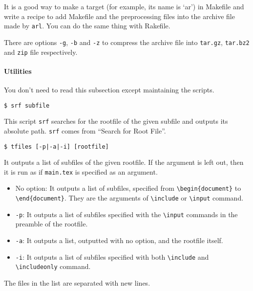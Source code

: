 It is a good way to make a target (for example, its name is `ar') in
Makefile and write a recipe to add Makefile and the preprocessing files
into the archive file made by \texttt{arl}. You can do the same thing
with Rakefile.

There are options \texttt{-g}, \texttt{-b} and \texttt{-z} to compress
the archive file into \texttt{tar.gz}, \texttt{tar.bz2} and \texttt{zip}
file respectively.

\hypertarget{utilities}{%
\paragraph{Utilities}\label{utilities}}

You don't need to read this subsection except maintaining the scripts.

\begin{verbatim}
$ srf subfile
\end{verbatim}

This script \texttt{srf} searches for the rootfile of the given subfile
and outputs its absolute path. \texttt{srf} comes from ``Search for Root
File''.

\begin{verbatim}
$ tfiles [-p|-a|-i] [rootfile]
\end{verbatim}

It outputs a list of subfiles of the given rootfile. If the argument is
left out, then it is run as if \texttt{main.tex} is specified as an
argument.

\begin{itemize}
\tightlist
\item
  No option: It outputs a list of subfiles, specified from
  \texttt{\textbackslash{}begin\{document\}} to
  \texttt{\textbackslash{}end\{document\}}. They are the arguments of
  \texttt{\textbackslash{}include} or \texttt{\textbackslash{}input}
  command.
\item
  \texttt{-p}: It outputs a list of subfiles specified with the
  \texttt{\textbackslash{}input} commands in the preamble of the
  rootfile.
\item
  \texttt{-a}: It outputs a list, outputted with no option, and the
  rootfile itself.
\item
  \texttt{-i}: It outputs a list of subfiles specified with both
  \texttt{\textbackslash{}include} and
  \texttt{\textbackslash{}includeonly} command.
\end{itemize}

The files in the list are separated with new lines.

